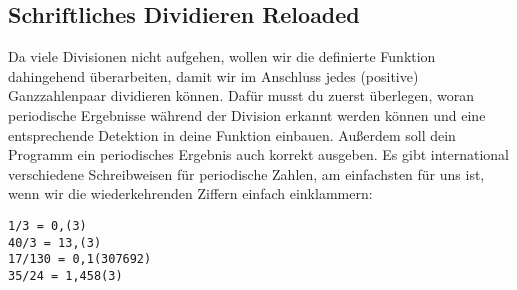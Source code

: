 \subsection{Schriftliches Dividieren Reloaded }
Da viele Divisionen nicht aufgehen, wollen wir die definierte Funktion dahingehend überarbeiten, damit wir im Anschluss jedes (positive) Ganzzahlenpaar dividieren können. Dafür musst du zuerst überlegen, woran periodische Ergebnisse während der Division erkannt werden können und eine entsprechende Detektion in deine Funktion einbauen. Außerdem soll dein Programm ein periodisches Ergebnis auch korrekt ausgeben. Es gibt international verschiedene Schreibweisen für periodische Zahlen, am einfachsten für uns ist, wenn wir die wiederkehrenden Ziffern einfach einklammern:
\begin{lstlisting}
1/3 = 0,(3)
40/3 = 13,(3)
17/130 = 0,1(307692)
35/24 = 1,458(3)
\end{lstlisting}
